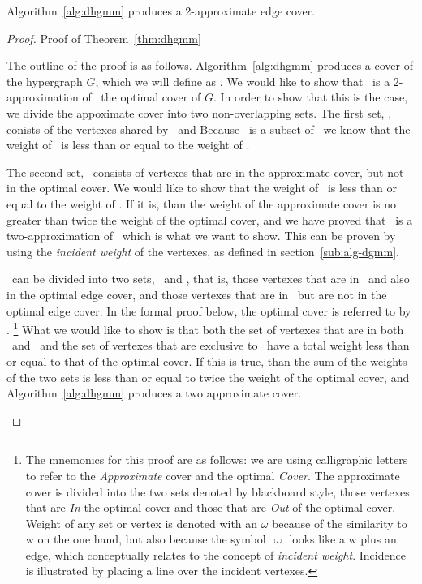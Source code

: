 

\begin{thm}
  Algorithm~\ref{alg:dhgmm} produces a 2-approximate edge cover.
  \label{thm:dhgmm}
\end{thm}
\begin{proof}{Proof of Theorem~\ref{thm:dhgmm}}
  \begin{smy}
    The outline of the proof is as follows. Algorithm~\ref{alg:dhgmm} produces a cover of the hypergraph $G$, which we will define as \cAd. We would like to show that \cAd\ is a 2-approximation of \cCd\, the optimal cover of $G$. In order to show that this is the case, we divide the appoximate cover into two non-overlapping sets. The first set, \bId, conists of the vertexes shared by \cAd\ and \cCd\. Because \bId\ is a subset of \cCd\, we know that the weight of \bId\ is less than or equal to the weight of \cCd. 

The second set, \bOd\, consists of vertexes that are in the approximate cover, but not in the optimal cover. We would like to show that the weight of \bOd\ is less than or equal to the weight of \cCd. If it is, than the weight of the approximate cover is no greater than twice the weight of the optimal cover, and we have proved that \cAd\ is a two-approximation of \cCd\, which is what we want to show. This can be proven by using the {\em incident weight} of the vertexes, as defined in section~\ref{sub:alg-dgmm}. 

\cAd\ can be divided into two sets, \bId\ and \bOd, that is, those vertexes that are in \cAd\ and also in the optimal edge cover, and those vertexes that are in \cAd\ but are not in the optimal edge cover. In the formal proof below, the optimal cover is referred to by \cCd. \footnote{The mnemonics for this proof are as follows: we are using calligraphic letters to refer to the {\em Approximate} cover and the optimal {\em Cover}. The approximate cover is divided into the two sets denoted by blackboard style, those vertexes that are {\em In} the optimal cover and those that are {\em Out} of the optimal cover. Weight of any set or vertex is denoted with an $\omega$ because of the similarity to w on the one hand, but also because the symbol $\varpi$ looks like a w plus an edge, which conceptually relates to the concept of {\em incident weight}. Incidence is illustrated by placing a line over the incident vertexes.} What we would like to show is that both the set of vertexes that are in both \cAd\ and \cCd\ and the set of vertexes that are exclusive to \cAd\ have a total weight less than or equal to that of the optimal cover. If this is true, than the sum of the weights of the two sets is less than or equal to twice the weight of the optimal cover, and Algorithm~\ref{alg:dhgmm} produces a two approximate cover.
  \end{smy}
    

\end{proof}
